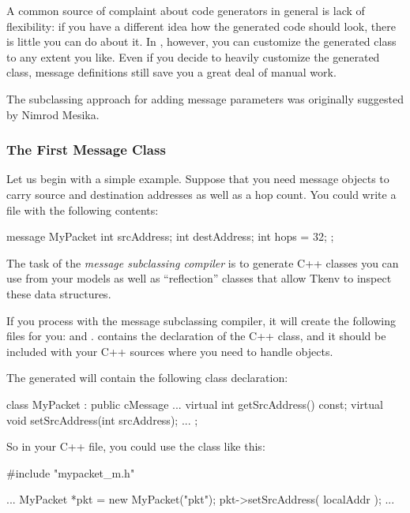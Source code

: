 A common source of complaint about code generators in general is
lack of flexibility: if you have a different idea how the generated
code should look, there is little you can do about it.
In {\opp}, however, you can
customize the generated class to any extent you like.
Even if you decide to heavily customize the generated class,
message definitions still save you a great deal of manual work.

The subclassing approach for adding message parameters was originally
suggested by Nimrod Mesika.


\subsubsection{The First Message Class}

Let us begin with a simple example. Suppose that you need message objects to
carry source and destination addresses as well as a hop count. You could write
a  file with the following contents:


\begin{msg}
message MyPacket
{
     int srcAddress;
     int destAddress;
     int hops = 32;
};
\end{msg}

The task of the \textit{message subclassing compiler} is to generate C++ classes
you can use from your models as well as ``reflection'' classes that allow
Tkenv to inspect these data structures.

If you process  with the message subclassing compiler, it will
create the following files for you:  and .
 contains the declaration of the  C++ class, and
it should be included with your C++ sources where you need to handle
 objects.

The generated  will contain the following class declaration:

\begin{cpp}
class MyPacket : public cMessage {
    ...
    virtual int getSrcAddress() const;
    virtual void setSrcAddress(int srcAddress);
    ...
};
\end{cpp}

So in your C++ file, you could use the  class like this:

\begin{cpp}
#include "mypacket_m.h"

...
MyPacket *pkt = new MyPacket("pkt");
pkt->setSrcAddress( localAddr );
...
\end{cpp}

